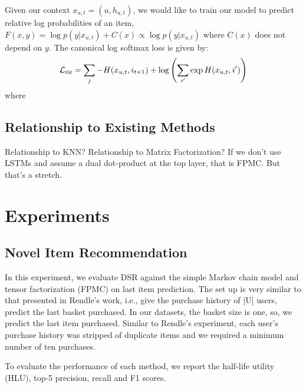 \documentclass{sig-alternate-05-2015}
\begin{document}
Given our context $x_{u,t} = (u, h_{u,t})$, we would like to train our model to predict relative log probabilities of an item, $F(x,y) = \log p(y|x_{u,t}) + C(x) \propto \log p(y|x_{u,t})$ where $C(x)$ does not depend on $y$. The canonical log softmax loss is given by:
\begin{align}
	\mathcal{L}_{\textsc{sm}} = \sum_j -H(x_{u,t}, i_{t+1}) + \log \left( \sum_{i'} \exp H(x_{u,t}, i') \right)
\end{align}
where 




\subsection{Relationship to Existing Methods}
Relationship to KNN? 
Relationship to Matrix Factorization? If we don't use LSTMs and assume a dual dot-product at the top layer, that is FPMC. But that's a stretch.  



\section{Experiments}

\subsection{Novel Item Recommendation}
In this experiment, we evaluate DSR against the simple Markov chain model and tensor factorization (FPMC) on last item prediction. The set up is very similar to that presented in Rendle's work, i.e., give the purchase history of |U| users, predict the last basket purchased. In our datasets, the basket size is one, so, we predict the last item purchased. Similar to Rendle's experiment, each user's purchase history was stripped of duplicate items and we required a minimum number of ten purchases. 

To evaluate the performance of each method, we report the half-life utility (HLU), top-5 precision, recall and F1 scores. 
\end{document}
